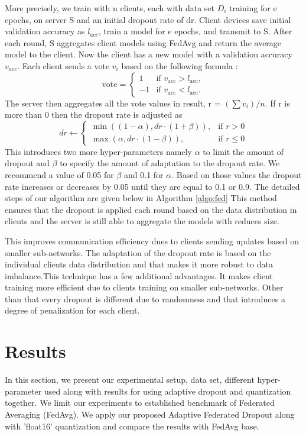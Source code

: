 \documentclass{article}
\begin{document}
More precisely, we train with n clients, each with data set $D_{i}$ training for e epochs, on server S and an initial dropout rate of dr. Client devices save initial validation accuracy as $l_{acc}$, train a model for e epochs, and transmit to S. After each round, S aggregates client models using FedAvg and return the average model to the client. Now the client has a new model with a validation accuracy $v_{acc}$. Each client sends a vote $v_{i}$ based on the following formula : 
\[
\text{vote} =
\begin{cases}
    1 & \text{if } v_{\text{acc}} > l_{\text{acc}}, \\
    -1 & \text{if } v_{\text{acc}} < l_{\text{acc}}.
\end{cases}
\]  The server then aggregates all the vote values in result, r = $(\sum v_{i}) / n$. If r is more than 0 then the dropout rate is adjusted as 
\[
dr \gets 
\begin{cases} 
\min((1 - \alpha), dr \cdot (1 + \beta)), & \text{if } r > 0 \\
\max(\alpha, dr \cdot (1 - \beta)), & \text{if } r \leq 0
\end{cases}
\] 
This introduces two more hyper-parameters namely $\alpha$ to limit the amount of dropout and $\beta$ to specify the amount of adaptation to the dropout rate. We recommend a value of 0.05 for $\beta$ and 0.1 for $\alpha$. Based on those values the dropout rate increases or decreases by 0.05 until they are equal to 0.1 or 0.9. The detailed steps of our algorithm are given below in Algorithm \ref{algo:fed} This method ensures that the dropout is applied each round based on the data distribution in clients and the server is still able to aggregate the models with reduces size.

This improves communication efficiency dues to clients sending updates based on smaller sub-networks. The adaptation of the dropout rate is based on the individual clients data distribution and that makes it more robust to data imbalance.This technique has a few additional advantages. It makes client training more efficient due to clients training on smaller sub-networks. Other than that every dropout is different due to randomness and that introduces a degree of penalization for each client.

\section{Results}

In this section, we present our experimental setup, data set, different hyper-parameter used along with results for using adaptive dropout and quantization together. We limit our experiments to established benchmark of Federated Averaging (FedAvg). We apply our proposed Adaptive Federated Dropout along with 'float16' quantization and compare the results with FedAvg base.
\end{document}
